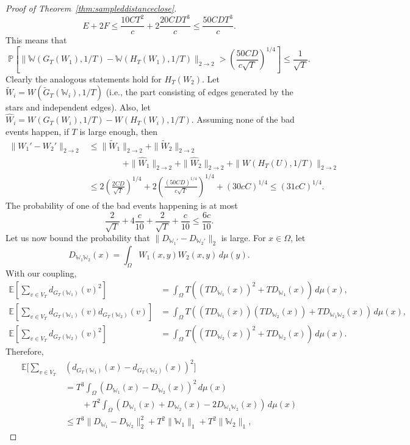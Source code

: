 \documentclass{amsart}
\numberwithin{equation}{section}
\numberwithin{figure}{section}
\theoremstyle{definition}
\theoremstyle{remark}
\newcommand{\EE}{\mathbb{E}}
\newcommand{\PP}{\mathbb{P}}
\newcommand{\cW}{\mathbb{W}}
\begin{document}
\begin{proof}[Proof of Theorem~\ref{thm:sampleddistanceclose}]
\[E+2F \le \frac{10CT^2}{c}+ 2 \frac{20CDT^3}{c}
\le \frac{{50}CDT^3}{c}
.\]
This means that
\[\PP\left[\|\cW(G_T(W_1),1/T)-\cW(H_T(W_1),1/T)\|_{2 \rightarrow 2} > \left(\frac{{50}CD}{c\sqrt{T}}\right)^{1/4}\right] \le \frac{1}{\sqrt{T}}
.\] Clearly the analogous statements hold for $H_T(W_2)$. Let
$\widetilde{W}_i=W(\widetilde{G}_T(\cW_i),1/T)$ (i.e., the part consisting of
edges generated by the stars and independent edges). Also, let
$\widehat{W}_i=W(G_T(W_i),1/T)-W(H_T(W_i),1/T)$. Assuming none of the bad
events happen, if $T$ is large enough, then
\begin{align*}
\|W_1'-W_2'\|_{2 \rightarrow 2} &\le
\|\widetilde{W}_1\|_{2 \rightarrow 2}+\|\widetilde{W}_2\|_{2 \rightarrow 2}\\
& \qquad \qquad \phantom{} + \|\widehat{W}_1\|_{2 \rightarrow 2} + \|\widehat{W}_2\|_{2 \rightarrow 2}+\|W(H_T(U),1/T)\|_{2 \rightarrow 2}
\\
&\le 2\left(\frac{2CD}{\sqrt{T}}\right)^{1/4}+2 \left(\frac{({50}CD)^{1/4}}{c\sqrt{T}}\right)^{1/4}
+ (30cC)^{1/4}
\le (31cC)^{1/4} .
\end{align*}
The probability of one of
the bad events happening is at most
\[\frac{2}{\sqrt{T}}+4 \frac{c}{10}+\frac{2}{\sqrt{T}}+\frac{c}{10} \le \frac{6c}{10}
.\]
Let us now bound the probability that $\|D_{\cW_1'}-D_{\cW_2'}\|_2$ is large.
For $x \in \Omega$, let
\[D_{\cW_1\cW_2}(x)=\int_{\Omega}W_1(x,y)W_2(x,y) \,d\mu(y) .\]
With our coupling,
\begin{align*}
\EE\left[\sum_{v \in V_T} d_{G_T(\cW_1)}(v)^2\right]&=\int_\Omega T
\left((TD_{\cW_1}(x))^2 + TD_{\cW_1}(x) \right) \,d\mu(x),\\
\EE\left[\sum_{v \in V_T} d_{G_T(\cW_1)}(v)d_{G_T(\cW_2)}(v)\right]&=\int_\Omega T \left((TD_{\cW_1}(x))(TD_{\cW_2}(x))+TD_{\cW_1\cW_2}(x) \right) \,d\mu(x),\\
\EE\left[\sum_{v \in V_T} d_{G_T(\cW_2)}(v)^2\right]&=\int_\Omega T \left((TD_{\cW_2}(x))^2 + TD_{\cW_2}(x) \right) \,d\mu(x).
\end{align*}
Therefore,
\begin{align*}
\EE\Bigg[\sum_{v \in V_T} &\left(d_{G_T(\cW_1)}(x)-d_{G_T(\cW_2)}(x)\right)^2\Bigg]\\
& = T^3 \int_\Omega \left(D_{\cW_1}(x)-D_{\cW_2}(x)\right)^2 \,d\mu(x)
\\
& \qquad \phantom{} + T^2 \int_\Omega \left(D_{\cW_1}(x) + D_{\cW_2}(x) - 2D_{\cW_1\cW_2}(x) \right) \,d\mu(x)\\
&\leq T^3\|D_{\cW_1}-D_{\cW_2}\|_2^2+T^2\|\cW_1\|_1+T^2\|\cW_2\|_1,

\end{align*}
\end{proof}
\end{document}

